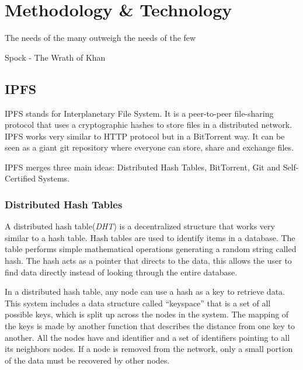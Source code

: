 \chapter{Methodology \& Technology}

\begin{FraseCelebre}
  \begin{Frase}
    The needs of the many outweigh the needs of the few
  \end{Frase}
  \begin{Fuente}
    Spock - The Wrath of Khan
  \end{Fuente}
\end{FraseCelebre}

\section{IPFS}
\label{tech:sec:ipfs}
IPFS stands for Interplanetary File System. It is a peer-to-peer file-sharing
protocol that uses a cryptographic hashes to store files in a distributed
network. IPFS works very similar to HTTP protocol but in a BitTorrent way. It
can be seen as a giant git repository where everyone can store, share and
exchange files\cite{benet2014ipfs}.

IPFS merges three main ideas: Distributed Hash Tables, BitTorrent, Git and
Self-Certified Systems.

\subsection{Distributed Hash Tables}
A distributed hash table(\emph{DHT}) is a decentralized structure that works
very similar to a hash table. Hash tables are used to identify items in a
database. The table performs simple mathematical operations generating a random
string called hash. The hash acts as a pointer that directs to the data, this
allows the user to find data directly instead of looking through the entire
database\cite{kaluszka2010distributed}.

In a distributed hash table, any node can use a hash as a key to retrieve data.
This system includes a data structure called ``keyspace'' that is a set of all
possible keys, which is split up across the nodes in the system. The mapping of
the keys is made by another function that describes the distance from one key to
another. All the nodes have and identifier and a set of identifiers pointing to
all its neighbors nodes. If a node is removed from the network, only a small
portion of the data must be recovered by other
nodes\cite{kaluszka2010distributed}.

